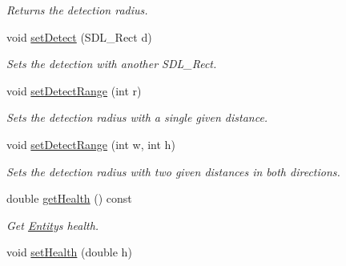 \begin{DoxyCompactItemize}
\begin{DoxyCompactList}\small\item\em Returns the detection radius. \end{DoxyCompactList}\item 
void \hyperlink{classEntity_a7624a9b21bbb1bd97d7f2eac20339a82}{set\+Detect} (S\+D\+L\+\_\+\+Rect d)\hypertarget{classEntity_a7624a9b21bbb1bd97d7f2eac20339a82}{}\label{classEntity_a7624a9b21bbb1bd97d7f2eac20339a82}

\begin{DoxyCompactList}\small\item\em Sets the detection with another S\+D\+L\+\_\+\+Rect. \end{DoxyCompactList}\item 
void \hyperlink{classEntity_a884a7f8a537f3d0e926dfedb8e88a740}{set\+Detect\+Range} (int r)\hypertarget{classEntity_a884a7f8a537f3d0e926dfedb8e88a740}{}\label{classEntity_a884a7f8a537f3d0e926dfedb8e88a740}

\begin{DoxyCompactList}\small\item\em Sets the detection radius with a single given distance. \end{DoxyCompactList}\item 
void \hyperlink{classEntity_af4b91451301036e4aed029e90a7ba726}{set\+Detect\+Range} (int w, int h)\hypertarget{classEntity_af4b91451301036e4aed029e90a7ba726}{}\label{classEntity_af4b91451301036e4aed029e90a7ba726}

\begin{DoxyCompactList}\small\item\em Sets the detection radius with two given distances in both directions. \end{DoxyCompactList}\item 
double \hyperlink{classEntity_a19c16788d1361e72ac26abb48c7d760f}{get\+Health} () const \hypertarget{classEntity_a19c16788d1361e72ac26abb48c7d760f}{}\label{classEntity_a19c16788d1361e72ac26abb48c7d760f}

\begin{DoxyCompactList}\small\item\em Get \hyperlink{classEntity}{Entity}\textquotesingle{}s health. \end{DoxyCompactList}\item 
void \hyperlink{classEntity_a4f521d321ea874c474cc0506ff78da08}{set\+Health} (double h)\hypertarget{classEntity_a4f521d321ea874c474cc0506ff78da08}{}\label{classEntity_a4f521d321ea874c474cc0506ff78da08}


\end{DoxyCompactItemize}

